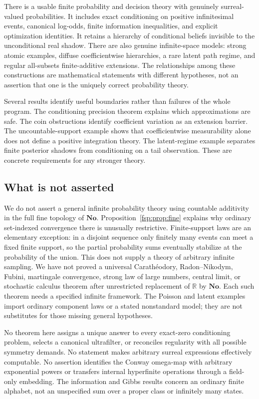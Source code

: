 \documentclass[11pt,a4paper]{article}
\numberwithin{equation}{section}
\theoremstyle{definition}
\theoremstyle{remark}
\newcommand{\R}{\mathbb R}
\newcommand{\No}{\mathbf{No}}
\begin{document}
There is a usable finite probability and decision theory with genuinely
surreal-valued probabilities. It includes exact conditioning on positive
infinitesimal events, canonical log-odds, finite information inequalities,
and explicit optimization identities. It retains a hierarchy of
conditional beliefs invisible to the unconditional real shadow.
There are also genuine infinite-space models: strong atomic examples,
diffuse coefficientwise hierarchies, a rare latent path regime, and
regular all-subsets finite-additive extensions. The relationships among
these constructions are mathematical statements with different hypotheses,
not an assertion that one is the uniquely correct probability theory.

Several results identify useful boundaries rather than failures of the
whole program. The conditioning precision theorem explains which
approximations are safe. The coin obstructions identify coefficient
variation as an extension barrier. The uncountable-support example shows
that coefficientwise measurability alone does not define a positive
integration theory. The latent-regime example separates finite posterior
shadows from conditioning on a tail observation. These are concrete
requirements for any stronger theory.

\subsection{What is not asserted}\label{fsp:sub:notasserted}

We do not assert a general infinite probability theory using countable
additivity in the full fine topology of $\No$.
Proposition~\ref{fsp:prop:fine} explains why ordinary set-indexed convergence
there is unusually restrictive. Finite-support laws are an elementary
exception: in a disjoint sequence only finitely many events can meet a
fixed finite support, so the partial probability sums eventually stabilize
at the probability of the union. This does not supply a theory of arbitrary
infinite sampling.
We have not proved a universal Carath\'eodory, Radon--Nikodym, Fubini,
martingale convergence, strong law of large numbers, central limit, or stochastic calculus
theorem after unrestricted replacement of $\R$ by $\No$. Each such
theorem needs a specified infinite framework. The Poisson and latent
examples import ordinary component laws or a stated nonstandard model;
they are not substitutes for those missing general hypotheses.

No theorem here assigns a unique answer to every exact-zero conditioning
problem, selects a canonical ultrafilter, or reconciles regularity with
all possible symmetry demands. No statement makes arbitrary surreal
expressions effectively computable. No assertion identifies the Conway
omega-map with arbitrary exponential powers or transfers internal
hyperfinite operations through a field-only embedding. The information
and Gibbs results concern an ordinary finite alphabet, not an
unspecified sum over a proper class or infinitely many states.
\end{document}
